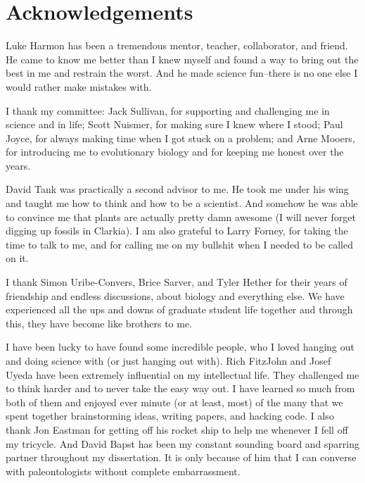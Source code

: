 \chapter*{Acknowledgements}

Luke Harmon has been a tremendous mentor, teacher, collaborator, and friend. He came to know me better than I knew myself and found a way to bring out the best in me and restrain the worst. And he made science fun--there is no one else I would rather make mistakes with. 

I thank my committee: Jack Sullivan, for supporting and challenging me in science and in life; Scott Nuismer, for making sure I knew where I stood; Paul Joyce, for always making time when I got stuck on a problem; and Arne Mooers, for introducing me to evolutionary biology and for keeping me honest over the years.

David Tank was practically a second advisor to me. He took me under his wing and taught me how to think and how to be a scientist. And somehow he was able to convince me that plants are actually pretty damn awesome (I will never forget digging up fossils in Clarkia). I am also grateful to Larry Forney, for taking the time to talk to me, and for calling me on my bullshit when I needed to be called on it.

I thank Simon Uribe-Convers, Brice Sarver, and Tyler Hether for their years of friendship and endless discussions, about biology and everything else. We have experienced all the ups and downs of graduate student life together and through this, they have become like brothers to me.

I have been lucky to have found some incredible people, who I loved hanging out and doing science with (or just hanging out with). Rich FitzJohn and Josef Uyeda have been extremely influential on my intellectual life. They challenged me to think harder and to never take the easy way out. I have learned so much from both of them and enjoyed ever minute (or at least, most) of the many that we spent together brainstorming ideas, writing papers, and hacking code. I also thank Jon Eastman for getting off his rocket ship to help me whenever I fell off my tricycle. And David Bapst has been my constant sounding board and sparring partner throughout my dissertation. It is only because of him that I can converse with paleontologists without complete embarrassment.

